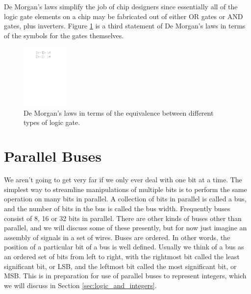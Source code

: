 \documentclass[../physical_computing.tex]{subfiles}
\begin{document}
De Morgan's laws simplify the job of chip designers since essentially all of the logic gate elements on a chip may be fabricated out of either OR gates or AND gates, plus inverters. Figure \ref{fig:de_morgan_logic} is a third statement of De Morgan's laws in terms of the symbols for the gates themselves.

\begin{figure}[htbp]
    \centering
    \includegraphics[width=0.2\textwidth]{figures/de_morgan_logic.pdf}
    \caption{\label{fig:de_morgan_logic} De Morgan's laws in terms of the equivalence between different types of logic gate.}
\end{figure}

\section{Parallel Buses}
\label{sec:parallel_buses}

We aren't going to get very far if we only ever deal with one bit at a time. The simplest way to streamline manipulations of multiple bits is to perform the same operation on many bits in parallel. A collection of bits in parallel is called a bus, and the number of bits in the bus is called the bus width. Frequently buses consist of 8, 16 or 32 bits in parallel. There are other kinds of buses other than parallel, and we will discuss some of these presently, but for now just imagine an assembly of signals in a set of wires. Buses are ordered. In other words, the position of a particular bit of a bus is well defined. Usually we think of a bus as an ordered set of bits from left to right, with the rightmost bit called the least significant bit, or LSB, and the leftmost bit called the most significant bit, or MSB. This is in preparation for use of parallel buses to represent integers, which we will discuss in Section \ref{sec:logic_and_integers}. 
\end{document}

